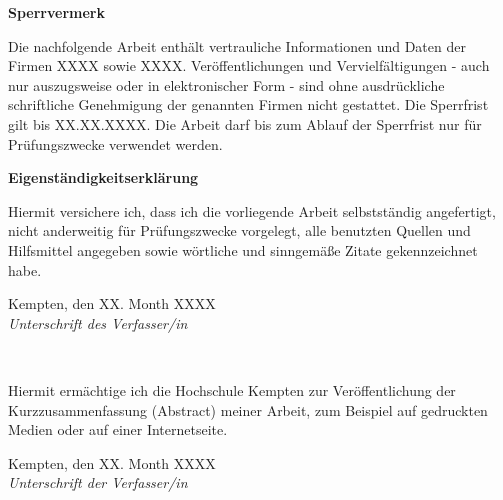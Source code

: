\newpage
\thispagestyle{empty}

{\Large \textbf{Sperrvermerk}}\\ 

\vspace*{5mm}

\noindent
Die nachfolgende Arbeit enthält vertrauliche Informationen und Daten der Firmen XXXX sowie XXXX. Veröffentlichungen und Vervielfältigungen - auch nur auszugsweise oder in elektronischer Form - sind ohne ausdrückliche schriftliche Genehmigung der genannten Firmen nicht gestattet. Die Sperrfrist gilt bis XX.XX.XXXX. Die Arbeit darf bis zum Ablauf der Sperrfrist nur für Prüfungszwecke verwendet werden.

\vspace*{20mm}

{\Large \textbf{Eigenständigkeitserklärung}}\\ 

\vspace*{5mm}

\noindent
Hiermit versichere ich, dass ich die vorliegende Arbeit selbstständig angefertigt, nicht anderweitig für Prüfungszwecke vorgelegt, alle benutzten Quellen und Hilfsmittel angegeben sowie wörtliche und sinngemäße Zitate gekennzeichnet habe.
\vspace{2cm}

\noindent
Kempten, den XX. Month XXXX
\hspace*{2cm}%
\dotfill\\
\hspace*{8.5cm}%
\textit{Unterschrift des Verfasser/in}

\vspace*{20mm}

\\ 

\vspace*{5mm}

\noindent
Hiermit ermächtige ich die Hochschule Kempten zur Veröffentlichung der Kurzzusammen\-fassung (Abstract) meiner Arbeit, zum Beispiel auf gedruckten Medien oder auf einer Internetseite.
\vspace{2cm}

\noindent
Kempten, den XX. Month XXXX
\hspace*{2cm}%
\dotfill\\
\hspace*{8.5cm}%
\textit{Unterschrift der Verfasser/in}
